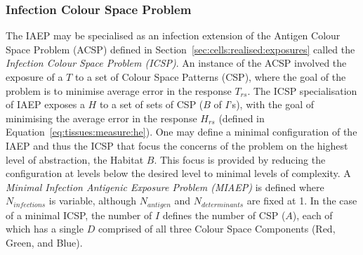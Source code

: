 %
%
\subsubsection{Infection Colour Space Problem}
The IAEP may be specialised as an infection extension of the Antigen Colour Space Problem (ACSP) defined in Section~\ref{sec:cells:realised:exposures} called the \emph{Infection Colour Space Problem (ICSP)}. An instance of the ACSP involved the exposure of a $T$ to a set of Colour Space Patterns (CSP), where the goal of the problem is to minimise average error in the response $T_{rs}$. The ICSP specialisation of IAEP exposes a $H$ to a set of sets of CSP ($B$ of $I$'s), with the goal of minimising the average error in the response $H_{rs}$ (defined in Equation~\ref{eq:tissues:measure:he}).
One may define a minimal configuration of the IAEP and thus the ICSP that focus the concerns of the problem on the highest level of abstraction, the Habitat $B$. This focus is provided by reducing the configuration at levels below the desired level to minimal levels of complexity. A \emph{Minimal Infection Antigenic Exposure Problem (MIAEP)} is defined where $N_{infections}$ is variable, although $N_{antigen}$ and $N_{determinants}$ are fixed at 1. In the case of a minimal ICSP, the number of $I$ defines the number of CSP ($A$), each of which has a single $D$ comprised of all three Colour Space Components (Red, Green, and Blue).


